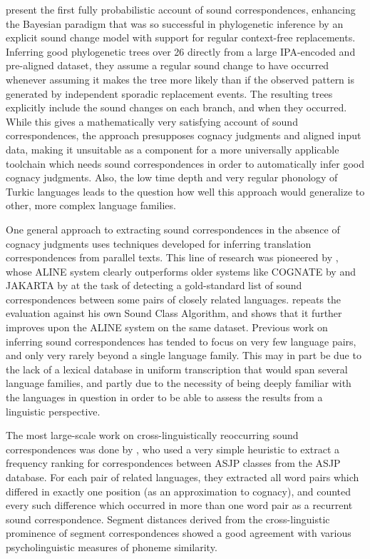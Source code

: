 \cite{hruschka_ea_2015} present the first fully probabilistic account of sound correspondences, enhancing the Bayesian paradigm that was so successful in phylogenetic inference by an explicit sound change model with support for regular context-free replacements. Inferring good phylogenetic trees over 26  directly from a large IPA-encoded and pre-aligned dataset, they assume a regular sound change to have occurred whenever assuming it makes the tree more likely than if the observed pattern is generated by independent sporadic replacement events. The resulting trees explicitly include the sound changes on each branch, and when they occurred. While this gives a mathematically very satisfying account of sound correspondences, the approach presupposes cognacy judgments and aligned input data, making it unsuitable as a component for a more universally applicable toolchain which needs sound correspondences in order to automatically infer good cognacy judgments. Also, the low time depth and very regular phonology of Turkic languages leads to the question how well this approach would generalize to other, more complex language families.

One general approach to extracting sound correspondences in the absence of cognacy judgments uses techniques developed for inferring translation correspondences from parallel texts. This line of research was pioneered by \cite{kondrak2002}, whose ALINE system clearly outperforms older systems like COGNATE by \cite{guy1984} and JAKARTA by \cite{oakes2000} at the task of detecting a gold-standard list of sound correspondences between some pairs of closely related languages. \cite{list2014} repeats the evaluation against his own Sound Class Algorithm, and shows that it further improves upon the ALINE system on the same dataset. Previous work on inferring sound correspondences has tended to focus on very few language pairs, and only very rarely beyond a single language family. This may in part be due to the lack of a lexical database in uniform transcription that would span several language families, and partly due to the necessity of being deeply familiar with the languages in question in order to be able to
assess the results from a linguistic perspective.

The most large-scale work on cross-linguistically reoccurring sound correspondences was done by \cite{brown_ea_2013}, who used a very simple heuristic to extract a frequency ranking for correspondences between ASJP classes from the ASJP database. For each pair of related languages, they extracted all word pairs which differed in exactly one position (as an approximation to cognacy), and counted every such difference which occurred in more than one word pair as a recurrent sound correspondence. Segment distances derived from the cross-linguistic prominence of segment correspondences showed a good agreement with various psycholinguistic measures of phoneme similarity.

